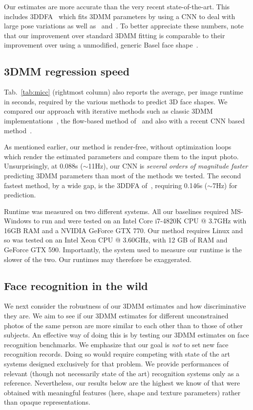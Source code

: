 \documentclass[10pt,twocolumn,letterpaper]{article}
\begin{document}
Our estimates are more accurate than the very recent state-of-the-art. This includes 3DDFA~\cite{Zhu2016Face} which fits 3DMM parameters by using a CNN to deal with large pose variations as well as~\cite{huber:3dmm} and~\cite{Bas:accvw16}. To better appreciate these numbers, note that our improvement over standard 3DMM fitting is comparable to their improvement over using a unmodified, generic Basel face shape~\cite{paysan09basel}. 


\subsection{3DMM regression speed} Tab.~\ref{tab:micc} (rightmost column) also reports the average, per image runtime in seconds, required by the various methods to predict 3D face shapes. We compared our approach with iterative methods such as classic 3DMM implementations~\cite{Bas:accvw16,huber:3dmm,romdhani2005estimating}, the flow-based method of~\cite{hassner2013viewing} and also with a recent CNN based method~\cite{Zhu2016Face}.

As mentioned earlier, our method is render-free, without optimization loops which render the estimated parameters and compare them to the input photo. Unsurprisingly, at 0.088s ($\sim$11Hz), our CNN is {\em several orders of magnitude faster} predicting 3DMM parameters than most of the methods we tested. The second fastest method, by a wide gap, is the 3DDFA of~\cite{Zhu2016Face}, requiring 0.146s ($\sim$7Hz) for prediction.

Runtime was measured on two different systems. All our baselines required MS-Windows to run and were tested on an Intel Core i7-4820K CPU @ 3.7GHz with 16GB RAM and a NVIDIA GeForce GTX 770. Our method requires Linux and so was tested on an Intel Xeon CPU @ 3.60GHz, with 12 GB of RAM and GeForce GTX 590. Importantly, the system used to measure our runtime is the slower of the two. Our runtimes may therefore be exaggerated.





\subsection{Face recognition in the wild}\label{sec:exp:rec}
We next consider the robustness of our 3DMM estimates and how discriminative they are. We aim to see if our 3DMM estimates for different unconstrained photos of the same person are more similar to each other than to those of other subjects. An effective way of doing this is by testing our 3DMM estimates on face recognition benchmarks. We emphasize that our goal is {\em not} to set new face recognition records. Doing so would require competing with state of the art systems designed exclusively for that problem. We provide performances of relevant (though not necessarily state of the art) recognition systems only as a reference. Nevertheless, our results below are the highest we know of that were obtained with meaningful features (here, shape and texture parameters) rather than opaque representations. 
\end{document}
